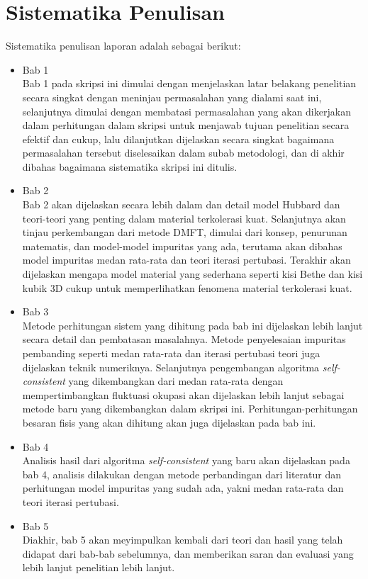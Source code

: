 \section{Sistematika Penulisan}
Sistematika penulisan laporan adalah sebagai berikut:
\begin{itemize}
	\item Bab 1 \babSatu \\
	Bab 1 pada skripsi ini dimulai dengan menjelaskan latar belakang penelitian secara singkat dengan meninjau permasalahan yang dialami saat ini, selanjutnya dimulai dengan membatasi permasalahan yang akan dikerjakan dalam perhitungan dalam skripsi untuk menjawab tujuan penelitian secara efektif dan cukup, lalu dilanjutkan dijelaskan secara singkat bagaimana permasalahan tersebut diselesaikan dalam subab metodologi, dan di akhir dibahas bagaimana sistematika skripsi ini ditulis.
	\item Bab 2 \babDua \\
	Bab 2 akan dijelaskan secara lebih dalam dan detail model Hubbard dan teori-teori yang penting dalam material terkolerasi kuat. Selanjutnya akan tinjau perkembangan dari metode DMFT, dimulai dari konsep, penurunan matematis, dan model-model impuritas yang ada, terutama akan dibahas model impuritas medan rata-rata dan teori iterasi pertubasi. Terakhir akan dijelaskan mengapa model material yang sederhana seperti kisi Bethe dan kisi kubik 3D cukup untuk memperlihatkan fenomena material terkolerasi kuat.
	\item Bab 3 \babTiga \\
	Metode perhitungan sistem yang dihitung pada bab ini dijelaskan lebih lanjut secara detail dan pembatasan masalahnya. Metode penyelesaian impuritas pembanding seperti medan rata-rata dan iterasi pertubasi teori juga dijelaskan teknik numeriknya. Selanjutnya pengembangan algoritma \textit{self-consistent} yang dikembangkan dari medan rata-rata dengan mempertimbangkan fluktuasi okupasi akan dijelaskan lebih lanjut sebagai metode baru yang dikembangkan dalam skripsi ini. Perhitungan-perhitungan besaran fisis yang akan dihitung akan juga dijelaskan pada bab ini.
	\item Bab 4 \babEmpat \\
	Analisis hasil dari algoritma \textit{self-consistent} yang baru akan dijelaskan pada bab 4, analisis dilakukan dengan metode perbandingan dari literatur dan perhitungan model impuritas yang sudah ada, yakni medan rata-rata dan teori iterasi pertubasi.
	\item Bab 5 \babLima \\
	Diakhir, bab 5 akan meyimpulkan kembali dari teori dan hasil yang telah didapat dari bab-bab sebelumnya, dan memberikan saran dan evaluasi yang lebih lanjut penelitian lebih lanjut.
\end{itemize}


